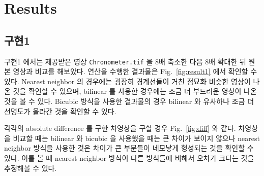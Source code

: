 \documentclass[a4paper, 12p]{paper}
\def\code#1{\texttt{#1}}
\begin{document}
\section{Results}
\subsection{구현1}

구현1 에서는 제공받은 영상 \code{Chronometer.tif} 을 8배 축소한 다음 8배 확대한 뒤 원본 영상과 비교를 해보았다. 연산을 수행한 결과물은 Fig.~\ref{fig:result1} 에서 확인할 수 있다. Nearest neighbor 의 경우에는 굉장히 경계선들이 거친 점묘화 비슷한 영상이 나온 것을 확인할 수 있으며, bilinear 를 사용한 경우에는 조금 더 부드러운 영상이 나온 것을 볼 수 있다. Bicubic 방식을 사용한 결과물의 경우 bilinear 와 유사하나 조금 더 선명도가 올라간 것을 확인할 수 있다.

각각의 absolute difference 를 구한 차영상을 구할 경우 Fig.~\ref{fig:diff} 와 같다. 차영상을 비교할 때는 bilinear 와 bicubic 을 사용했을 때는 큰 차이가 보이지 않으나 nearest neighbor 방식을 사용한 것은 차이가 큰 부분들이 네모낳게 형성되는 것을 확인할 수 있다. 이를 볼 때 nearest neighbor 방식이 다른 방식들에 비해서 오차가 크다는 것을 추정해볼 수 있다.
\end{document}
